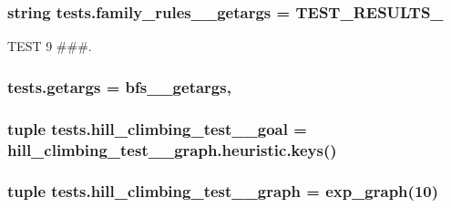 \subsubsection[{family\+\_\+rules\+\_\+2\+\_\+getargs}]{\setlength{\rightskip}{0pt plus 5cm}string tests.\+family\+\_\+rules\+\_\+\_\+getargs = \textquotesingle{}T\+E\+S\+T\+\_\+\+R\+E\+S\+U\+L\+T\+S\+\_\textquotesingle{}}\label{namespacetests_afd1704baf70a82cfa545df15dce643e8}


T\+E\+S\+T 9 \#\#\#. 

\hypertarget{namespacetests_a146bd4d7c49df2f93661cc5ea208ac41}{}
\subsubsection[{getargs}]{\setlength{\rightskip}{0pt plus 5cm}tests.\+getargs = {\bf bfs\+\_\+\_\+getargs},}\label{namespacetests_a146bd4d7c49df2f93661cc5ea208ac41}
\hypertarget{namespacetests_ac7c31605353856f989a374d17e295040}{}
\subsubsection[{hill\+\_\+climbing\+\_\+test\+\_\+6\+\_\+goal}]{\setlength{\rightskip}{0pt plus 5cm}tuple tests.\+hill\+\_\+climbing\+\_\+test\+\_\+\_\+goal = hill\+\_\+climbing\+\_\+test\+\_\+\_\+graph.\+heuristic.\+keys()}\label{namespacetests_ac7c31605353856f989a374d17e295040}
\hypertarget{namespacetests_a0edce2ec589dc545f26a7c5182953d0d}{}
\subsubsection[{hill\+\_\+climbing\+\_\+test\+\_\+6\+\_\+graph}]{\setlength{\rightskip}{0pt plus 5cm}tuple tests.\+hill\+\_\+climbing\+\_\+test\+\_\+\_\+graph = {\bf exp\+\_\+graph}(10)}\label{namespacetests_a0edce2ec589dc545f26a7c5182953d0d}
\hypertarget{namespacetests_a187bd1fb98a53370c815d1db888282e2}{}
